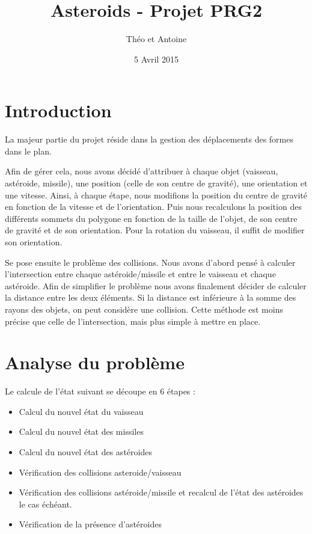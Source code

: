 \documentclass[a4paper,10pt,openany,oneside]{report}
\title{Asteroids - Projet PRG2}
\author{Théo \bsc{Nazé} et Antoine \bsc{Pinsard}}
\date{5 Avril 2015}
\begin{document}
\maketitle

\section{Introduction}

La majeur partie du projet réside dans la gestion des déplacements des formes
dans le plan.

Afin de gérer cela, nous avons décidé d'attribuer à chaque objet (vaisseau,
astéroide, missile), une position (celle de son centre de gravité), une
orientation et une vitesse. Ainsi, à chaque étape, nous modifions la position
du centre de gravité en fonction de la vitesse et de l'orientation. Puis nous
recalculons la position des différents sommets du polygone en fonction de la
taille de l'objet, de son centre de gravité et de son orientation. Pour la
rotation du vaisseau, il suffit de modifier son orientation.

Se pose ensuite le problème des collisions. Nous avons d'abord pensé à calculer
l'intersection entre chaque astéroide/missile et entre le vaisseau et chaque
astéroide. Afin de simplifier le problème nous avons finalement décider de
calculer la distance entre les deux éléments. Si la distance est inférieure à
la somme des rayons des objets, on peut considère une collision. Cette méthode
est moins précise que celle de l'intersection, mais plus simple à mettre en
place.

\section{Analyse du problème}

Le calcule de l'état suivant se découpe en 6 étapes :

\begin{itemize}
  \item Calcul du nouvel état du vaisseau
  \item Calcul du nouvel état des missiles
  \item Calcul du nouvel état des astéroides
  \item Vérification des collisions asteroide/vaisseau
  \item Vérification des collisions astéroide/missile et recalcul de l'état des
    astéroides le cas échéant.
  \item Vérification de la présence d'astéroides
\end{itemize}
\end{document}
